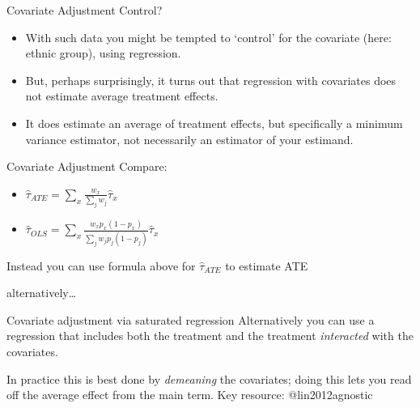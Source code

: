 \documentclass[
  11pt,
  ignorenonframetext,
]{beamer}
\providecommand{\tightlist}{%
  \setlength{\itemsep}{0pt}\setlength{\parskip}{0pt}}\usepackage{longtable,booktabs,array}
\begin{document}
\begin{frame}{Covariate Adjustment}
\protect\hypertarget{covariate-adjustment-2}{}
Control?

\begin{itemize}
\tightlist
\item
  With such data you might be tempted to `control' for the covariate
  (here: ethnic group), using regression.
\item
  But, perhaps surprisingly, it turns out that regression with
  covariates does not estimate average treatment effects.
\item
  It does estimate an average of treatment effects, but specifically a
  minimum variance estimator, not necessarily an estimator of your
  estimand.
\end{itemize}
\end{frame}

\begin{frame}{Covariate Adjustment}
\protect\hypertarget{covariate-adjustment-3}{}
Compare:

\begin{itemize}
\tightlist
\item
  \(\hat{\tau}_{ATE} =\sum_{x} \frac{w_x}{\sum_{j}w_{j}}\hat{\tau}_x\)
\item
  \(\hat{\tau}_{OLS} =\sum_{x} \frac{w_xp_x(1-p_x)}{\sum_{j}w_j{p_j(1-p_j)}}\hat{\tau}_x\)
\end{itemize}

Instead you can use formula above for \(\hat{\tau}_{ATE}\) to estimate
ATE

alternatively\ldots{}
\end{frame}

\begin{frame}{Covariate adjustment via saturated regression}
\protect\hypertarget{covariate-adjustment-via-saturated-regression}{}
Alternatively you can use a regression that includes both the treatment
and the treatment \emph{interacted} with the covariates.

In practice this is best done by \emph{demeaning} the covariates; doing
this lets you read off the average effect from the main term. Key
resource: @lin2012agnostic
\end{frame}
\end{document}
